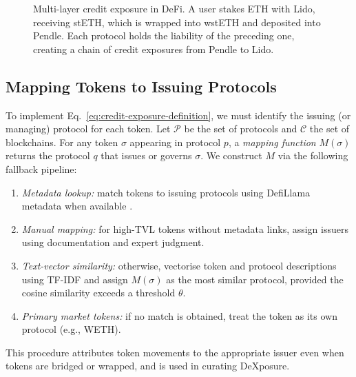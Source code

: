 \begin{figure}[!t]
    \caption{Multi-layer credit exposure in DeFi. A user stakes ETH with Lido, receiving stETH, which is wrapped into wstETH and deposited into Pendle. Each protocol holds the liability of the preceding one, creating a chain of credit exposures from Pendle to Lido.}
    \label{fig:exposure_example}
\end{figure}

\subsection{Mapping Tokens to Issuing Protocols}

To implement Eq.~\eqref{eq:credit-exposure-definition}, we must identify the issuing (or managing) protocol for each token. Let $\mathcal{P}$ be the set of protocols and $\mathcal{C}$ the set of blockchains. For any token $\sigma$ appearing in protocol $p$, a \emph{mapping function} $M(\sigma)$ returns the protocol $q$ that issues or governs $\sigma$. We construct $M$ via the following fallback pipeline:
\begin{enumerate}
  \item \emph{Metadata lookup:} match tokens to issuing protocols using DefiLlama metadata when available \cite{DefiLlama2026}.
  \item \emph{Manual mapping:} for high-TVL tokens without metadata links, assign issuers using documentation and expert judgment.
  \item \emph{Text-vector similarity:} otherwise, vectorise token and protocol descriptions using TF-IDF \cite{Qaiser2018} and assign $M(\sigma)$ as the most similar protocol, provided the cosine similarity exceeds a threshold $\theta$.
  \item \emph{Primary market tokens:} if no match is obtained, treat the token as its own protocol (e.g., WETH).
\end{enumerate}
This procedure attributes token movements to the appropriate issuer even when tokens are bridged or wrapped, and is used in curating DeXposure.

